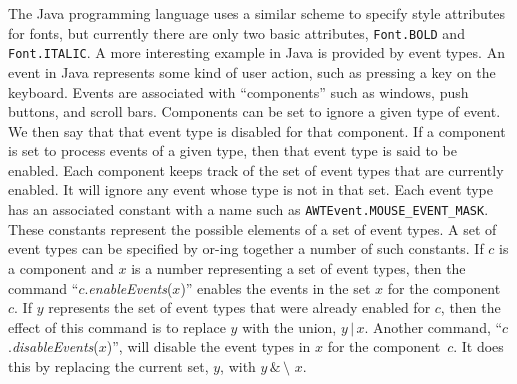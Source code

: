The Java programming language uses a similar scheme to specify style
attributes for fonts, but currently there are only two basic
attributes, \texttt{Font.BOLD} and \texttt{Font.ITALIC}.  A more
interesting example in Java is provided by event types.  An event in 
Java represents some kind of user action, such as pressing a key on the
keyboard.  Events are associated with ``components'' such as windows,
push buttons, and scroll bars.  Components can be set to ignore
a given type of event.  We then say that that event type is disabled
for that component.  If a component is set to process events of
a given type, then that event type is said to be enabled.  Each
component keeps track of the set of event types that are currently
enabled.  It will ignore any event whose type is not in that set.
Each event type has an associated constant with a name such
as \texttt{AWTEvent.MOUSE\_EVENT\_MASK}.  These constants represent
the possible elements of a set of event types.  A set of event types can be
specified by or-ing together a number of such constants.  If
$c$ is a component and $x$ is a number representing a set of event
types, then the command ``$c$.\textit{enableEvents}($x$)'' enables the
events in the set $x$ for the component~$c$.  If $y$ represents
the set of event types that were already enabled for $c$, then the effect
of this command is to replace $y$ with the union, $y\,|\,x$.  Another
command, ``$c$.\textit{disableEvents}($x$)'', will disable the
event types in $x$ for the component~$c$.  It does this by replacing
the current set, $y$, with $y\,\&\,\texttt{\char`\~}x$.


